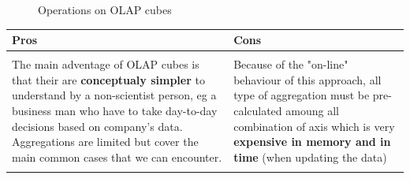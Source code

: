 \documentclass[a4paper,11pt,twoside]{article}
\begin{document}
\begin{figure} [h] %
\centerline{
}
\centerline{
}
\caption{\label{OLAP_operations} Operations on OLAP cubes} 
\end{figure}

\begin{center} %
\begin{tabular} {| l | l |}
\hline
\bf Pros & \bf Cons \\ \hline
& \\
\parbox[t][][t]{7cm}{The main adventage of OLAP cubes is that their are \textbf{conceptualy simpler} to understand by a non-scientist person, eg a business man who have to take day-to-day decisions based on company's data. Aggregations are limited but cover the main common cases that we can encounter.
}&
\parbox[t][][t]{7cm}{Because of the "on-line" behaviour of this approach, all type of aggregation must be pre-calculated amoung all combination of axis which is very \textbf{expensive in memory and in time} (when updating the data)}\\
& \\
\hline
\end{tabular}
\end{center}
\end{document}
